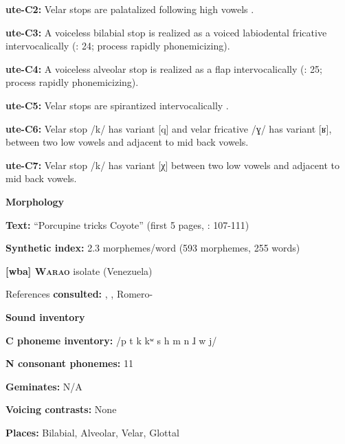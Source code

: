 \textbf{ute-C2:} Velar stops are palatalized following high vowels \citep[29]{Givón2011}.



\textbf{ute-C3:} A voiceless bilabial stop is realized as a voiced labiodental fricative intervocalically (\citealt{Givón2011}: 24; process rapidly phonemicizing).



\textbf{ute-C4:} A voiceless alveolar stop is realized as a flap intervocalically (\citealt{Givón2011}: 25; process rapidly phonemicizing).



\textbf{ute-C5:} Velar stops are spirantized intervocalically \citep[26-7]{Givón2011}.



\textbf{ute-C6:} Velar stop /k/ has variant [q] and velar fricative /ɣ/ has variant [ʁ], between two low vowels and adjacent to mid back vowels.



\textbf{ute-C7:} Velar stop /k/ has variant [χ] between two low vowels and adjacent to mid back vowels.



\textbf{Morphology}



\textbf{Text:} “Porcupine tricks Coyote” (first 5 pages, \citealt{Givón2013}: 107-111)



\textbf{Synthetic index:} 2.3 morphemes/word (593 morphemes, 255 words)



\textbf{[wba] \textsc{Warao}}  isolate (Venezuela)



References \textbf{consulted:} \citet{Arinterol2000}, \citet{Osborn1966}, Romero-\citet{Figeroa1997}



\textbf{Sound inventory}



\textbf{C phoneme inventory:} /p t k kʷ s h m n ɺ w j/



\textbf{N consonant phonemes:} 11



\textbf{Geminates:} N/A



\textbf{Voicing contrasts:} None



\textbf{Places:} Bilabial, Alveolar, Velar, Glottal



